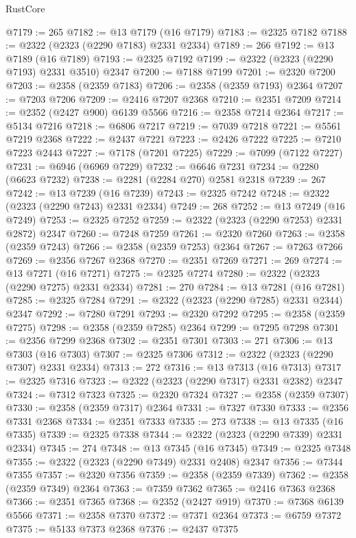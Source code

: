 \begin{lexlean}{RustCore}
\begin{coremodule}
@7179 := 265
@7182 := @13 @7179 (@16 @7179)
@7183 := @2325 @7182
@7188 := @2322 (@2323 (@2290 @7183) @2331 @2334)
@7189 := 266
@7192 := @13 @7189 (@16 @7189)
@7193 := @2325 @7192
@7199 := @2322 (@2323 (@2290 @7193) @2331 @3510) @2347
@7200 := @7188 @7199
@7201 := @2320 @7200
@7203 := @2358 (@2359 @7183)
@7206 := @2358 (@2359 @7193) @2364
@7207 := @7203 @7206
@7209 := @2416 @7207 @2368
@7210 := @2351 @7209
@7214 := @2352 (@2427 @900) @6139 @5566
@7216 := @2358 @7214 @2364
@7217 := @5134 @7216
@7218 := @6806 @7217
@7219 := @7039 @7218
@7221 := @5561 @7219 @2368
@7222 := @2437 @7221
@7223 := @2426 @7222
@7225 := @7210 @7223 @2443
@7227 := @7178 (@7201 @7225)
@7229 := @7099 (@7122 @7227)
@7231 := @6946 (@6969 @7229)
@7232 := @6646 @7231
@7234 := @2280 (@6623 @7232)
@7238 := @2281 (@2284 @270) @2581 @2318
@7239 := 267
@7242 := @13 @7239 (@16 @7239)
@7243 := @2325 @7242
@7248 := @2322 (@2323 (@2290 @7243) @2331 @2334)
@7249 := 268
@7252 := @13 @7249 (@16 @7249)
@7253 := @2325 @7252
@7259 := @2322 (@2323 (@2290 @7253) @2331 @2872) @2347
@7260 := @7248 @7259
@7261 := @2320 @7260
@7263 := @2358 (@2359 @7243)
@7266 := @2358 (@2359 @7253) @2364
@7267 := @7263 @7266
@7269 := @2356 @7267 @2368
@7270 := @2351 @7269
@7271 := 269
@7274 := @13 @7271 (@16 @7271)
@7275 := @2325 @7274
@7280 := @2322 (@2323 (@2290 @7275) @2331 @2334)
@7281 := 270
@7284 := @13 @7281 (@16 @7281)
@7285 := @2325 @7284
@7291 := @2322 (@2323 (@2290 @7285) @2331 @2344) @2347
@7292 := @7280 @7291
@7293 := @2320 @7292
@7295 := @2358 (@2359 @7275)
@7298 := @2358 (@2359 @7285) @2364
@7299 := @7295 @7298
@7301 := @2356 @7299 @2368
@7302 := @2351 @7301
@7303 := 271
@7306 := @13 @7303 (@16 @7303)
@7307 := @2325 @7306
@7312 := @2322 (@2323 (@2290 @7307) @2331 @2334)
@7313 := 272
@7316 := @13 @7313 (@16 @7313)
@7317 := @2325 @7316
@7323 := @2322 (@2323 (@2290 @7317) @2331 @2382) @2347
@7324 := @7312 @7323
@7325 := @2320 @7324
@7327 := @2358 (@2359 @7307)
@7330 := @2358 (@2359 @7317) @2364
@7331 := @7327 @7330
@7333 := @2356 @7331 @2368
@7334 := @2351 @7333
@7335 := 273
@7338 := @13 @7335 (@16 @7335)
@7339 := @2325 @7338
@7344 := @2322 (@2323 (@2290 @7339) @2331 @2334)
@7345 := 274
@7348 := @13 @7345 (@16 @7345)
@7349 := @2325 @7348
@7355 := @2322 (@2323 (@2290 @7349) @2331 @2408) @2347
@7356 := @7344 @7355
@7357 := @2320 @7356
@7359 := @2358 (@2359 @7339)
@7362 := @2358 (@2359 @7349) @2364
@7363 := @7359 @7362
@7365 := @2416 @7363 @2368
@7366 := @2351 @7365
@7368 := @2352 (@2427 @919)
@7370 := @7368 @6139 @5566
@7371 := @2358 @7370
@7372 := @7371 @2364
@7373 := @6759 @7372
@7375 := @5133 @7373 @2368
@7376 := @2437 @7375

\end{coremodule}
\end{lexlean}
